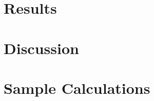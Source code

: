 \documentclass[12pt]{article}
\begin{document}
\section{Results}
\label{sec:org3ee95c9}

\section{Discussion}
\label{sec:orgf65ec6d}

\section{Sample Calculations}
\label{sec:org280700f}
\end{document}

